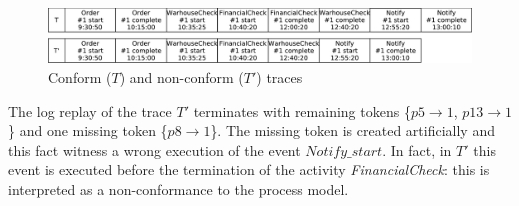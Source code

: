 \documentclass{llncs}
\begin{document}
\begin{figure}[h]
\centering
\includegraphics[width=0.9\linewidth]
{./items/logConforme.pdf}
\caption{Conform ($T$) and non-conform ($T'$) traces}
\label{ConfLog}
\end{figure}


The log replay of the trace $T'$ terminates with remaining tokens \{$p5 \rightarrow 1$, $p13 \rightarrow 1$\} and one missing token \{${p8 \rightarrow 1}$\}. The missing token is created artificially and this fact witness a wrong execution of the event $Notify\_start$. In fact, in $T'$ this event is executed before the termination of the activity \emph{FinancialCheck}: this is interpreted as a non-conformance to the process model. 

\end{document}
